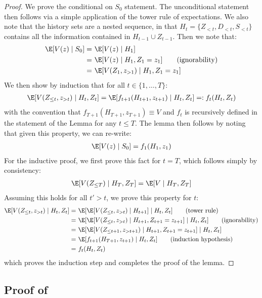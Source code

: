 \begin{proof}
We prove the conditional on $S_0$ statement. The unconditional statement then follows via a simple application of the tower rule of expectations. We also note that the history sets are a nested sequence, in that $H_t=\{Z_{<t}, D_{<t}, S_{<t}\}$ contains all the information contained in $H_{t-1}\cup Z_{t-1}$. Then we note that:
    \begin{align*}
        \E[V(z)\mid S_0] =~& \E[V(z)\mid H_1]\\
        =~& \E[V(z)\mid H_1, Z_1=z_1] \tag{ignorability}\\
        =~& \E[V(Z_1, z_{> 1})\mid H_1, Z_1=z_1]
    \end{align*}
We then show by induction that for all $t\in \{1, \ldots, T\}$:
\begin{align}
    \E[V(Z_{\leq t}, z_{> t})\mid H_t, Z_t] = \E[f_{t+1}(H_{t+1}, z_{t+1})\mid H_t, Z_t] =: f_t(H_t, Z_t)
\end{align}
with the convention that $f_{T+1}(H_{T+1}, z_{T+1})\equiv V$ and $f_t$ is recursively defined in the statement of the Lemma for any $t\leq T$.
The lemma then follows by noting that given this property, we can re-write:
\begin{align*}
    \E[V(z)\mid S_0] = f_1(H_1, z_1)
\end{align*}
For the inductive proof, we first prove this fact for $t=T$, which follows simply by consistency:
\begin{align*}
\E[V(Z_{\leq T})\mid H_T, Z_T] = \E[V\mid H_T, Z_T]
\end{align*}
Assuming this holds for all $t'>t$, we prove this property for $t$:
\begin{align*}
    \E[V(Z_{\leq t}, z_{>t})\mid H_{t}, Z_{t}] =~& \E[\E[V(Z_{\leq t}, z_{>t})\mid H_{t+1}]\mid H_{t}, Z_{t}] \tag{tower rule}\\
    =~& \E[\E[V(Z_{\leq t}, z_{>t})\mid H_{t+1}, Z_{t+1}=z_{t+1}]\mid H_{t}, Z_{t}] \tag{ignorability}\\
    =~& \E[\E[V(Z_{\leq t+1}, z_{>t+1})\mid H_{t+1}, Z_{t+1}=z_{t+1}]\mid H_{t}, Z_{t}]\\
    =~& \E[f_{t+1}(H_{T+1}, z_{t+1}) \mid H_{t}, Z_{t}] \tag{induction hypothesis}\\
    =~& f_{t}(H_t, Z_t)
\end{align*}
which proves the induction step and completes the proof of the lemma.
\end{proof}

\subsection{Proof of }

